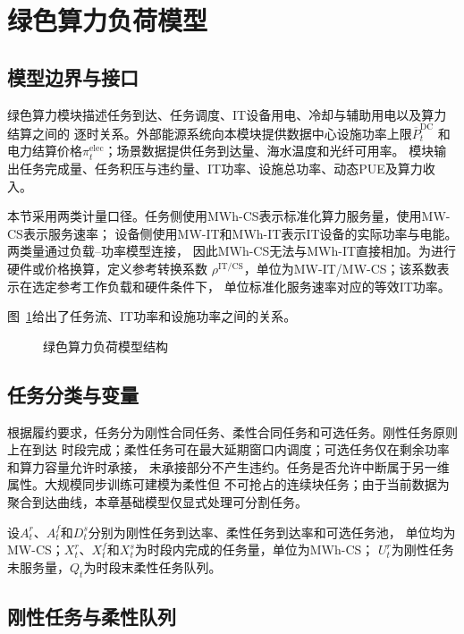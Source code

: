 \section{绿色算力负荷模型}
\label{sec:compute}

\subsection{模型边界与接口}

绿色算力模块描述任务到达、任务调度、IT设备用电、冷却与辅助用电以及算力结算之间的
逐时关系。外部能源系统向本模块提供数据中心设施功率上限$\overline P_t^{\mathrm{DC}}$
和电力结算价格$\pi_t^{\mathrm{elec}}$；场景数据提供任务到达量、海水温度和光纤可用率。
模块输出任务完成量、任务积压与违约量、IT功率、设施总功率、动态PUE及算力收入。

本节采用两类计量口径。任务侧使用MWh-CS表示标准化算力服务量，使用MW-CS表示服务速率；
设备侧使用MW-IT和MWh-IT表示IT设备的实际功率与电能。两类量通过负载--功率模型连接，
因此MWh-CS无法与MWh-IT直接相加。为进行硬件或价格换算，定义参考转换系数
$\rho^{\mathrm{IT/CS}}$，单位为MW-IT/MW-CS；该系数表示在选定参考工作负载和硬件条件下，
单位标准化服务速率对应的等效IT功率。

图~\ref{fig:compute-model}给出了任务流、IT功率和设施功率之间的关系。
\begin{figure}[H]
\centering
\resizebox{0.92\textwidth}{!}{}
\caption{绿色算力负荷模型结构}
\label{fig:compute-model}
\end{figure}

\subsection{任务分类与变量}

根据履约要求，任务分为刚性合同任务、柔性合同任务和可选任务。刚性任务原则上在到达
时段完成；柔性任务可在最大延期窗口内调度；可选任务仅在剩余功率和算力容量允许时承接，
未承接部分不产生违约。任务是否允许中断属于另一维属性。大规模同步训练可建模为柔性但
不可抢占的连续块任务；由于当前数据为聚合到达曲线，本章基础模型仅显式处理可分割任务。

设$A_t^r$、$A_t^f$和$D_t^s$分别为刚性任务到达率、柔性任务到达率和可选任务池，
单位均为MW-CS；$X_t^r$、$X_t^f$和$X_t^s$为时段内完成的任务量，单位为MWh-CS；
$U_t^r$为刚性任务未服务量，$Q_t$为时段末柔性任务队列。

\subsection{刚性任务与柔性队列}

